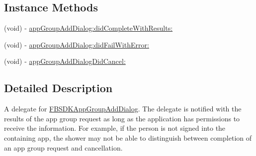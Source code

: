 \subsection*{Instance Methods}
\begin{DoxyCompactItemize}
\item 
(void) -\/ \hyperlink{protocol_f_b_s_d_k_app_group_add_dialog_delegate-p_abfcec4aa4e6c80f5220af8983b0bec27}{app\-Group\-Add\-Dialog\-:did\-Complete\-With\-Results\-:}
\item 
(void) -\/ \hyperlink{protocol_f_b_s_d_k_app_group_add_dialog_delegate-p_a0639394cc50c3e8fcaee3ffb8d21c3bb}{app\-Group\-Add\-Dialog\-:did\-Fail\-With\-Error\-:}
\item 
(void) -\/ \hyperlink{protocol_f_b_s_d_k_app_group_add_dialog_delegate-p_a93e2f514934d20fe2a5a15160e123caf}{app\-Group\-Add\-Dialog\-Did\-Cancel\-:}
\end{DoxyCompactItemize}


\subsection{Detailed Description}
A delegate for \hyperlink{interface_f_b_s_d_k_app_group_add_dialog}{F\-B\-S\-D\-K\-App\-Group\-Add\-Dialog}.  The delegate is notified with the results of the app group request as long as the application has permissions to receive the information. For example, if the person is not signed into the containing app, the shower may not be able to distinguish between completion of an app group request and cancellation. 

